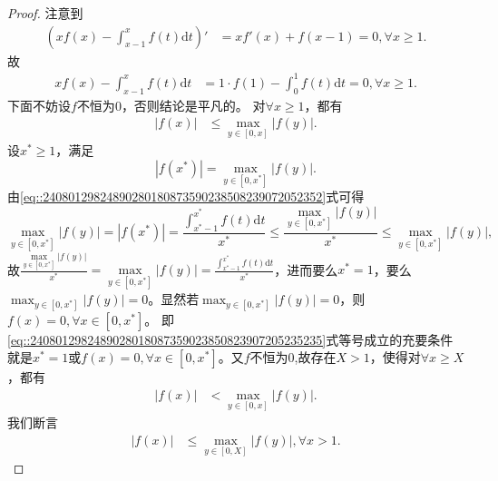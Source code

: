 \documentclass[../../main.tex]{subfiles}%
\begin{document}
\begin{proof}

注意到
\begin{align*}
\left( xf\left( x \right) -\int_{x-1}^x{f\left( t \right) \mathrm{d}t} \right) ' &= xf'\left( x \right) +f\left( x-1 \right) =0,\forall x\geqslant 1. 
\end{align*}
故
\begin{align}
xf\left( x \right) -\int_{x-1}^x{f\left( t \right) \mathrm{d}t} &= 1\cdot f\left( 1 \right) -\int_0^1{f\left( t \right) \mathrm{d}t}=0,\forall x\geqslant 1. \label{eq::24080129824890280180873590238508239072052352}
\end{align}
下面不妨设$f$不恒为$0$，否则结论是平凡的。
对$\forall x\geqslant 1$，都有
\begin{align}
\left| f\left( x \right) \right| &\leqslant \max_{y\in \left[ 0,x \right]} \left| f\left( y \right) \right|. \label{eq::2408012982489028018087359023850823907205235235}
\end{align}
设$x^*\geqslant 1$，满足
\[
\left| f\left( x^* \right) \right|=\max_{y\in \left[ 0,x^* \right]} \left| f\left( y \right) \right|.
\]
由\eqref{eq::24080129824890280180873590238508239072052352}式可得
\[
\max_{y\in \left[ 0,x^* \right]} \left| f\left( y \right) \right|=\left| f\left( x^* \right) \right|=\frac{\int_{x^*-1}^{x^*}{f\left( t \right) \mathrm{d}t}}{x^*}\leqslant \frac{\max\limits_{y\in \left[ 0,x^* \right]} \left| f\left( y \right) \right|}{x^*}\leqslant \max_{y\in \left[ 0,x^* \right]} \left| f\left( y \right) \right|,
\]
故$\frac{\max\limits_{y\in \left[ 0,x^* \right]} \left| f\left( y \right) \right|}{x^*}=\max\limits_{y\in \left[ 0,x^* \right]} \left| f\left( y \right) \right|=\frac{\int_{x^*-1}^{x^*}{f\left( t \right) \mathrm{d}t}}{x^*}$，进而要么$x^*=1$，要么$\max_{y\in \left[ 0,x^* \right]} \left| f\left( y \right) \right|=0$。显然若$\max_{y\in \left[ 0,x^* \right]} \left| f\left( y \right) \right|=0$，则$f\left( x \right) =0,\forall x\in \left[ 0,x^* \right]$。
即\eqref{eq::2408012982489028018087359023850823907205235235}式等号成立的充要条件就是$x^*=1$或$f\left( x \right) =0,\forall x\in \left[ 0,x^* \right]$。又$f$不恒为0,故存在$X> 1$，使得对$\forall x\geqslant X$，都有
\begin{align}
\left| f\left( x \right) \right| &< \max_{y\in \left[ 0,x \right]} \left| f\left( y \right) \right|. \label{eq::2408012982489028018087359023850823907205235236}
\end{align}
我们断言
\begin{align}
\left| f\left( x \right) \right| &\leqslant \max_{y\in \left[ 0,X \right]} \left| f\left( y \right) \right|,\forall x>1. \label{eq::2408012982489028018087359023850823907205235237}

\end{align}
\end{proof}
\end{document}
